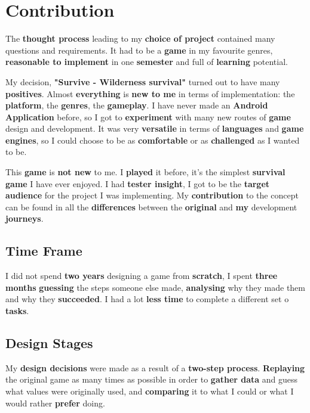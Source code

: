 \chapter*{Contribution}
	\par The \textbf{thought process} leading to my \textbf{choice of project} contained many questions and requirements. It had to be a \textbf{game} in my favourite genres, \textbf{reasonable to implement} in one \textbf{semester} and full of \textbf{learning} potential.
	\par My decision, \textbf{"Survive - Wilderness survival"} turned out to have many \textbf{positives}. Almost \textbf{everything} is \textbf{new to me} in terms of implementation: the \textbf{platform}, the \textbf{genres}, the \textbf{gameplay}. I have never made an \textbf{Android Application} before, so I got to \textbf{experiment} with many new routes of \textbf{game} design and development. It was very \textbf{versatile} in terms of \textbf{languages} and \textbf{game engines}, so I could choose to be as \textbf{comfortable} or as \textbf{challenged} as I wanted to be.
	\par This \textbf{game} is \textbf{not new} to me. I \textbf{played} it before, it's the simplest \textbf{survival game} I have ever enjoyed. I had \textbf{tester insight}, I got to be the \textbf{target audience} for the project I was implementing. My \textbf{contribution} to the concept can be found in all the \textbf{differences} between the \textbf{original} and \textbf{my} development \textbf{journeys}. 

	\section*{Time Frame}
		\par I did not spend \textbf{two years} designing a game from \textbf{scratch}, I spent \textbf{three months} \textbf{guessing} the steps someone else made, \textbf{analysing} why they made them and why they \textbf{succeeded}. I had a lot \textbf{less time} to complete a different set o \textbf{tasks}.

	\section*{Design Stages}
		\par My \textbf{design decisions} were made as a result of a \textbf{two-step process}. \textbf{Replaying} the original game as many times as possible in order to \textbf{gather data} and guess what values were originally used, and \textbf{comparing} it to what I could or what I would rather \textbf{prefer} doing. 

